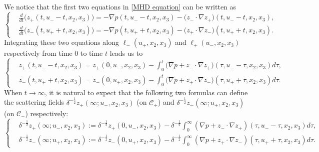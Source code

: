 \documentclass[10pt,reqno]{amsart}
\numberwithin{equation}{section}
\begin{document}
We notice that the first two equations in \eqref{MHD equation} can be written as 
\begin{equation*}
	\begin{cases}
&\displaystyle
	\frac{d}{dt}\big(z_{+}(t,u_--t,x_2,x_3)\big) =-\nabla p(t,u_--t,x_2,x_3)-\big(z_{-}\cdot\nabla z_{+}\big)(t,u_--t,x_2,x_3),\\
&\displaystyle
	\frac{d}{dt}\big(z_{-}(t,u_++t,x_2,x_3)\big) =-\nabla p(t,u_++t,x_2,x_3)-\big(z_{+}\cdot\nabla z_{-}\big)(t,u_++t,x_2,x_3).
	\end{cases}
\end{equation*}
Integrating these two equations along  $\ell_-(u_+,x_2,x_3)$ and  $\ell_+(u_-,x_2,x_3)$ respectively
from time $0$ to time $t$ leads us to
\begin{equation*}
	\begin{cases}
&\displaystyle	z_+(t,u_--t,x_2,x_3)=z_+(0,u_-,x_2,x_3)-\int_0^t\big(\nabla p+z_{-}\cdot\nabla z_{+}\big)(\tau,u_--\tau,x_2,x_3)d\tau,\\
&\displaystyle	z_-(t,u_++t,x_2,x_3)=z_-(0,u_+,x_2,x_3)-\int_0^t\big(\nabla p+z_{+}\cdot\nabla z_{-}\big)(\tau,u_++\tau,x_2,x_3)d\tau.	\end{cases}
\end{equation*}
When $t\to \infty$, it is natural to expect that the following two formulas can  define the scattering fields $\delta^{-\frac{1}{2}}z_+(\infty;u_-,x_2,x_3)$ (on $\mathcal{C}_+$) and  $\delta^{-\frac{1}{2}}z_-(\infty;u_+,x_2,x_3)$ (on $\mathcal{C}_-$) respectively:
\begin{equation}\label{eq:def-sca}
\begin{cases}
	&\displaystyle
	\delta^{-\frac{1}{2}}z_{+}(\infty;u_-,x_2,x_3):= \delta^{-\frac{1}{2}}z_{+}(0,u_-,x_2,x_3)- \delta^{-\frac{1}{2}}\int_0^{\infty}(\nabla p+z_{-}\cdot\nabla z_{+})(\tau,u_--\tau,x_2,x_3)d\tau,\\
&\displaystyle 	\delta^{-\frac{1}{2}}z_{-}(\infty;u_+,x_2,x_3):= \delta^{-\frac{1}{2}}z_{-}(0,u_+,x_2,x_3)- \delta^{-\frac{1}{2}}\int_0^{\infty}(\nabla p+z_{+}\cdot\nabla z_{-})(\tau,u_++\tau,x_2,x_3)d\tau.
\end{cases}	
\end{equation}
\end{document}
